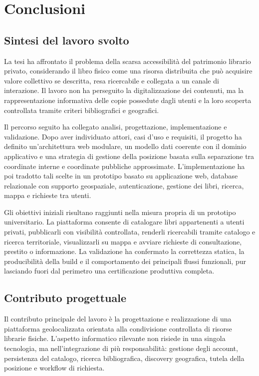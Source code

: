 \chapter{Conclusioni}
\label{chap:conclusioni}

\section{Sintesi del lavoro svolto}
\label{sec:sintesi-lavoro}

La tesi ha affrontato il problema della scarsa accessibilità del patrimonio librario privato, considerando il libro fisico come una risorsa distribuita che può acquisire valore collettivo se descritta, resa ricercabile e collegata a un canale di interazione. Il lavoro non ha perseguito la digitalizzazione dei contenuti, ma la rappresentazione informativa delle copie possedute dagli utenti e la loro scoperta controllata tramite criteri bibliografici e geografici.

Il percorso seguito ha collegato analisi, progettazione, implementazione e validazione. Dopo aver individuato attori, casi d'uso e requisiti, il progetto ha definito un'architettura web modulare, un modello dati coerente con il dominio applicativo e una strategia di gestione della posizione basata sulla separazione tra coordinate interne e coordinate pubbliche approssimate. L'implementazione ha poi tradotto tali scelte in un prototipo basato su applicazione web, database relazionale con supporto geospaziale, autenticazione, gestione dei libri, ricerca, mappa e richieste tra utenti.

Gli obiettivi iniziali risultano raggiunti nella misura propria di un prototipo universitario. La piattaforma consente di catalogare libri appartenenti a utenti privati, pubblicarli con visibilità controllata, renderli ricercabili tramite catalogo e ricerca territoriale, visualizzarli su mappa e avviare richieste di consultazione, prestito o informazione. La validazione ha confermato la correttezza statica, la producibilità della build e il comportamento dei principali flussi funzionali, pur lasciando fuori dal perimetro una certificazione produttiva completa.

\section{Contributo progettuale}
\label{sec:contributo-progettuale}

Il contributo principale del lavoro è la progettazione e realizzazione di una piattaforma geolocalizzata orientata alla condivisione controllata di risorse librarie fisiche. L'aspetto informatico rilevante non risiede in una singola tecnologia, ma nell'integrazione di più responsabilità: gestione degli account, persistenza del catalogo, ricerca bibliografica, discovery geografica, tutela della posizione e workflow di richiesta.

